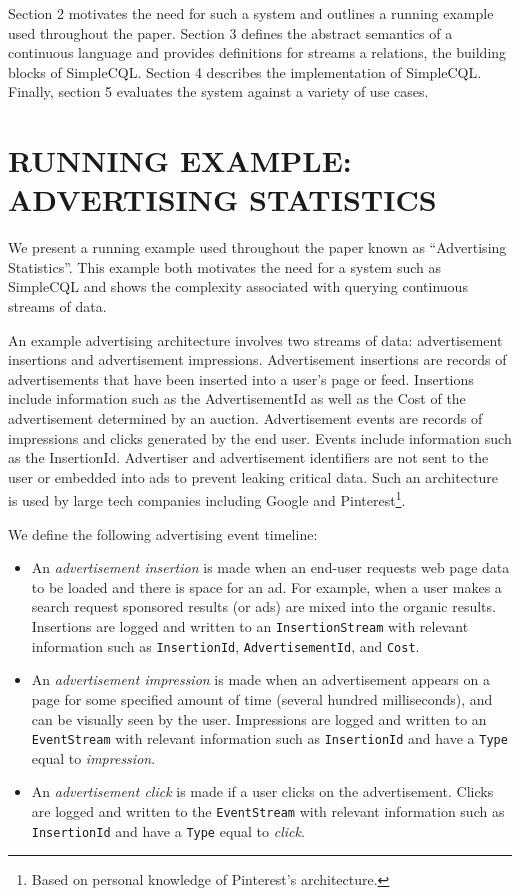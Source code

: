\documentclass[a4paper, 10pt, conference]{IEEEconf}
\begin{document}
Section 2 motivates the need for such a system and outlines a running example used throughout the paper.  Section 3 defines the abstract semantics of a continuous language and provides definitions for streams a relations, the building blocks of SimpleCQL.  Section 4 describes the implementation of SimpleCQL.  Finally, section 5 evaluates the system against a variety of use cases.

\section{RUNNING EXAMPLE: ADVERTISING STATISTICS}
We present a running example used throughout the paper known as “Advertising Statistics”.  This example both motivates the need for a system such as SimpleCQL and shows the complexity associated with querying continuous streams of data.

An example advertising architecture involves two streams of data: advertisement insertions and advertisement impressions.  Advertisement insertions are records of advertisements that have been inserted into a user’s page or feed.  Insertions include information such as the AdvertisementId as well as the Cost of the advertisement determined by an auction.  Advertisement events are records of impressions and clicks generated by the end user.  Events include information such as the InsertionId.  Advertiser and advertisement identifiers are not sent to the user or embedded into ads to prevent leaking critical data.  Such an architecture is used by large tech companies including Google \cite{photon} and Pinterest\footnote{Based on personal knowledge of Pinterest's architecture.}.  

We define the following advertising event timeline:

\begin{itemize}
  \item An \textit{advertisement insertion} is made when an end-user requests web page data to be loaded and there is space for an ad. For example, when a user makes a search request sponsored results (or ads) are mixed into the organic results.  Insertions are logged and written to an \texttt{InsertionStream} with relevant information such as \texttt{InsertionId}, \texttt{AdvertisementId}, and \texttt{Cost}.

  \item An \textit{advertisement impression} is made when an advertisement appears on a page for some specified amount of time (several hundred milliseconds), and can be visually seen by the user. Impressions are logged and written to an \texttt{EventStream} with relevant information such as \texttt{InsertionId} and have a \texttt{Type} equal to \textit{impression}.

  \item An \textit{advertisement click} is made if a user clicks on the advertisement. Clicks are logged and written to the \texttt{EventStream} with relevant information such as \texttt{InsertionId} and have a \texttt{Type} equal to \textit{click}.
\end{itemize}
\end{document}
